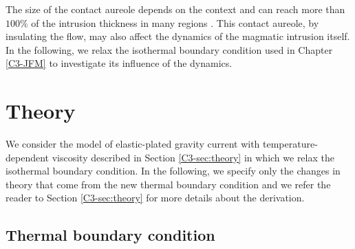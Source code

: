 The size of  the contact aureole depends on the  context and can reach
more  than  $100\%$  of  the   intrusion  thickness  in  many  regions
\citep{Galushkin:1997dy}.   This contact  aureole,  by insulating  the
flow, may also  affect the dynamics of the  magmatic intrusion itself.
In the following,  we relax the isothermal boundary  condition used in
Chapter \ref{C3-JFM} to investigate its influence of the dynamics.

\section{Theory}
\label{C4-sec:theory-1}

We  consider   the  model  of  elastic-plated   gravity  current  with
temperature-dependent      viscosity     described      in     Section
\ref{C3-sec:theory}  in   which  we  relax  the   isothermal  boundary
condition. In  the following,  we specify only  the changes  in theory
that come  from the new  thermal boundary  condition and we  refer the
reader  to  Section \ref{C3-sec:theory}  for  more  details about  the
derivation.

\subsection{Thermal boundary condition}
\label{C4-sec:formulation-1}

